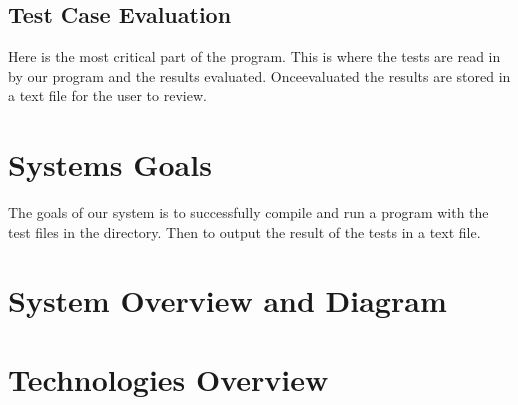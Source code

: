\subsection{Test Case Evaluation}
Here is the most critical part of the program. This is where the tests are read in by our program and the results evaluated. 
Onceevaluated the results are stored in a text file for the user to review. 

\section{Systems Goals}
The goals of our system is to successfully compile and run a program with the test files in the directory. Then to output the result of the tests in a text file. 

\section{System Overview and Diagram}


\section{Technologies Overview}


